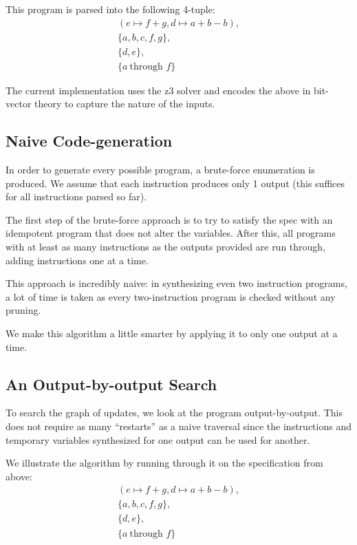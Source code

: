 \documentclass[letterpaper,twocolumn,10pt]{article}
\begin{document}
This program is parsed into the following 4-tuple:
\begin{align*}
    (e \mapsto f + g, d \mapsto a + b - b), \\
    \{a, b, c, f, g\}, \\
    \{d, e\}, \\
    \{a\ \text{through } f\}
\end{align*}

The current implementation uses the z3 solver and encodes the above in
bit-vector theory to capture the nature of the inputs.

\subsection{Naive Code-generation}

In order to generate every possible program, a brute-force
enumeration is produced. We assume that each instruction
produces only 1 output (this suffices for all instructions
parsed so far).

The first step of the brute-force approach is to try to satisfy the
spec with an idempotent program that does not alter the variables.
After this, all programs with at least as many instructions as the
outputs provided are run through, adding instructions one at a time.

This approach is incredibly naive: in synthesizing even two instruction
programs, a lot of time is taken as every two-instruction program is
checked without any pruning.

We make this algorithm a little smarter by applying it to only one output
at a time.

\subsection{An Output-by-output Search}

To search the graph of updates, we look at the program output-by-output.
This does not require as many ``restarts'' as a naive traversal
since the instructions and temporary variables synthesized for
one output can be used for another.

We illustrate the algorithm by running through it on the specification from above:
\begin{align*}
    (e \mapsto f + g, d \mapsto a + b - b), \\
    \{a, b, c, f, g\}, \\
    \{d, e\}, \\
    \{a\ \text{through } f\}
\end{align*}
\end{document}
